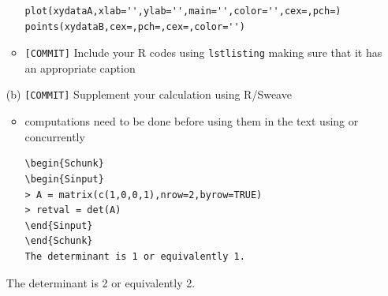 \documentclass[12pt]{article}
\begin{document}
\begin{itemize}
\begin{itemize}
\begin{lstlisting}
plot(xydataA,xlab='',ylab='',main='',color='',cex=,pch=)
points(xydataB,cex=,pch=,cex=,color='')
\end{lstlisting}
            \item \verb+[COMMIT]+  Include your R codes using \verb+lstlisting+ making sure that it has an appropriate caption
        \end{itemize}
    \item[(b)] \verb+[COMMIT]+  Supplement your calculation using R/Sweave
        \begin{itemize}
            \item computations need to be done before using them in the text
                using \verb++ or concurrently
\begin{lstlisting}
\begin{Schunk}
\begin{Sinput}
> A = matrix(c(1,0,0,1),nrow=2,byrow=TRUE)
> retval = det(A)
\end{Sinput}
\end{Schunk}
The determinant is 1 or equivalently 1.
\end{lstlisting}
        \end{itemize}
        
The determinant is 2 or equivalently 2.


\end{itemize}
\end{document}
